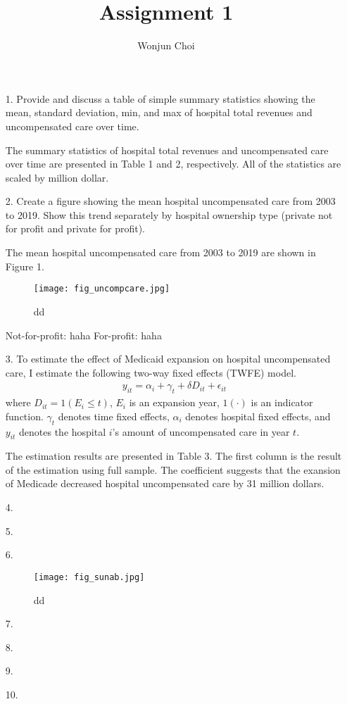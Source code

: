 \documentclass[12pt]{article}
\title{Assignment 1}
\author{Wonjun Choi}
\begin{document}
\maketitle
	\begin{itemize}
		\item[1.] Provide and discuss a table of simple summary statistics showing the mean, standard deviation, min, and max of hospital total revenues and uncompensated care over time.
		
		The summary statistics of hospital total revenues and uncompensated care over time are presented in Table 1 and 2, respectively. All of the statistics are scaled by million dollar.
		
		
		
		
		
		\item[2.] Create a figure showing the mean hospital uncompensated care from 2003 to 2019. Show this trend separately by hospital ownership type (private not for profit and private for profit).
		
		The mean hospital uncompensated care from 2003 to 2019 are shown in Figure 1.
		\begin{figure} [ht]
			\centering
			\texttt{[image: fig\_uncompcare.jpg]}
			\caption{dd}
		\end{figure}
		Not-for-profit: haha
		For-profit: haha
		
		\item[3.] To estimate the effect of  Medicaid expansion on hospital uncompensated care, I estimate the following two-way fixed effects (TWFE) model.
		\begin{eqnarray}
			y_{it} = \alpha_i + \gamma_t + \delta D_{it} + \epsilon_{it}
		\end{eqnarray}
	    where $D_{it} = 1(E_i \le t)$, $E_i$ is an expansion year, $1(\cdot)$ is an indicator function. $\gamma_t$ denotes time fixed effects, $\alpha_i$ denotes hospital fixed effects, and $y_{it}$ denotes the hospital $i$’s amount of uncompensated care in year $t$.
	    
	    
	    
	    The estimation results are presented in Table 3.  The first column is the result of the estimation using full sample. The coefficient suggests that the exansion of Medicade decreased hospital uncompensated care by 31 million dollars.
	    		
		\item[4.]
		
		\item[5.]
		
		\item[6.]
		\begin{figure}
			\centering
			  \texttt{[image: fig\_sunab.jpg]}
			  \caption{dd}
		\end{figure}
		
		\item[7.]
		
		\item[8.]
		
		\item[9.]
		
		\item[10.]
	\end{itemize}
\end{document}
